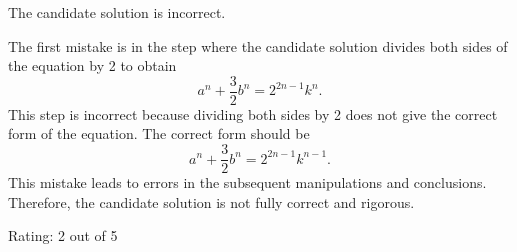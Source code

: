 The candidate solution is incorrect.

The first mistake is in the step where the candidate solution divides both sides of the equation by 2 to obtain
\[a^n + \frac{3}{2}b^n = 2^{2n-1}k^n.\]
This step is incorrect because dividing both sides by 2 does not give the correct form of the equation. The correct form should be
\[a^n + \frac{3}{2}b^n = 2^{2n-1}k^{n-1}.\]
This mistake leads to errors in the subsequent manipulations and conclusions. Therefore, the candidate solution is not fully correct and rigorous.

Rating: 2 out of 5
